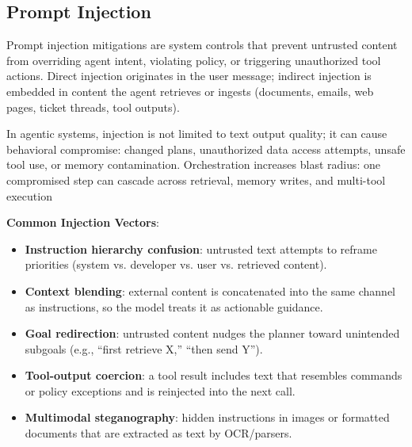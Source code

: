 \begin{TNtwocol}
    \section{Prompt Injection}

    Prompt injection mitigations are system controls that prevent untrusted content from overriding agent intent, violating policy, or triggering unauthorized tool actions. Direct injection originates in the user message; indirect injection is embedded in content the agent retrieves or ingests (documents, emails, web pages, ticket threads, tool outputs).

    In agentic systems, injection is not limited to text output quality; it can cause behavioral compromise: changed plans, unauthorized data access attempts, unsafe tool use, or memory contamination. Orchestration increases blast radius: one compromised step can cascade across retrieval, memory writes, and multi-tool execution

    \textbf{Common Injection Vectors}:
    \begin{itemize}
        \item \textbf{Instruction hierarchy confusion}: untrusted text attempts to reframe priorities (system vs. developer vs. user vs. retrieved content).
        \item \textbf{Context blending}: external content is concatenated into the same channel as instructions, so the model treats it as actionable guidance.
        \item \textbf{Goal redirection}: untrusted content nudges the planner toward unintended subgoals (e.g., “first retrieve X,” “then send Y”).
        \item \textbf{Tool-output coercion}: a tool result includes text that resembles commands or policy exceptions and is reinjected into the next call.
        \item \textbf{Multimodal steganography}: hidden instructions in images or formatted documents that are extracted as text by OCR/parsers.
    \end{itemize}


\end{TNtwocol}
